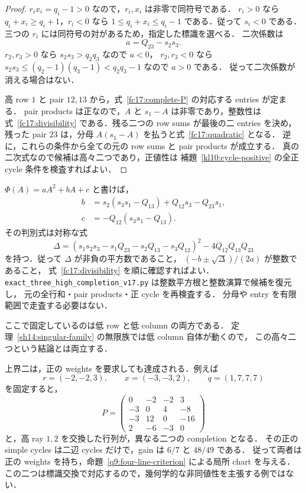 \begin{proof}
$r_ix_i=q_i-1>0$ なので，$r_i,x_i$ は非零で同符号である．
$r_i>0$ なら $q_i+x_i\ge q_i+1$，$r_i<0$ なら
$1\le q_i+x_i\le q_i-1$ である．従って $s_i<0$ である．
三つの $r_i$ には同符号の対があるため，指定した標識を選べる．
二次係数は
\begin{equation}\label{fc17:leading-coefficient}
 a=Q_{23}-s_2s_3.
\end{equation}
$r_2,r_3>0$ なら $s_2s_3>q_2q_3$ なので $a<0$，
$r_2,r_3<0$ なら $s_2s_3\le(q_2-1)(q_3-1)<q_2q_3-1$ なので $a>0$ である．
従って二次係数が消える場合はない．

高 row $1$ と pair $12,13$ から，式~\eqref{fc17:complete-P} の対応する entries が定まる．
pair products は正なので，$A$ と $s_1-A$ は非零であり，整数性は
式~\eqref{fc17:divisibility} である．残る二つの row sums が最後の二 entries を決め，
残った pair $23$ は，分母 $A(s_1-A)$ を払うと式~\eqref{fc17:quadratic} となる．
逆に，これらの条件から全ての元の row sums と pair products が成立する．
真の二次式なので候補は高々二つであり，正値性は
補題~\ref{kl10:cycle-positive} の全正 cycle 条件を検査すればよい．
\end{proof}

$\Phi(A)=aA^2+bA+c$ と書けば，
\begin{align*}
 b&=s_2(s_3s_1-Q_{13})+Q_{12}s_3-Q_{23}s_1,\\
 c&=-Q_{12}(s_3s_1-Q_{13}).
\end{align*}
その判別式は対称な式
\begin{equation}\label{fc17:discriminant}
 \Delta=
 (s_1s_2s_3-s_1Q_{23}-s_2Q_{13}-s_3Q_{12})^2
 -4Q_{12}Q_{13}Q_{23}
\end{equation}
を持つ．従って $\Delta$ が非負の平方数であること，
$(-b\pm\sqrt\Delta)/(2a)$ が整数であること，
式~\eqref{fc17:divisibility} を順に確認すればよい．
\nolinkurl{exact_three_high_completion_v17.py} は整数平方根と整数演算で候補を復元し，
元の全行和・pair products・正 cycle を再検査する．
分母や entry を有限範囲で走査する必要はない．

ここで固定しているのは低 row と低 column の両方である．
定理~\ref{sh14:singular-family} の無限族では低 column 自体が動くので，
この高々二つという結論とは両立する．

\begin{remark}[標識を固定した場合の上界の達成]
\label{fc17:sharp}
上界二は，正の weights を要求しても達成される．例えば
\[
 r=(-2,-2,3),\qquad x=(-3,-3,2),\qquad q=(1,7,7,7)
\]
を固定すると，
\[
 P=\begin{pmatrix}
 0&-2&-2&3\\
 -3&0&4&-8\\
 -3&12&0&-16\\
 2&-6&-3&0
 \end{pmatrix}
\]
と，高 ray $1,2$ を交換した行列が，異なる二つの completion となる．
その正の simple cycles は二辺 cycles だけで，gain は $6/7$ と $48/49$ である．
従って両者は正の weights を持ち，命題~\ref{q9:four-line-criterion} による局所 chart を与える．
この二つは標識交換で対応するので，幾何学的な非同値性を主張する例ではない．
\end{remark}

